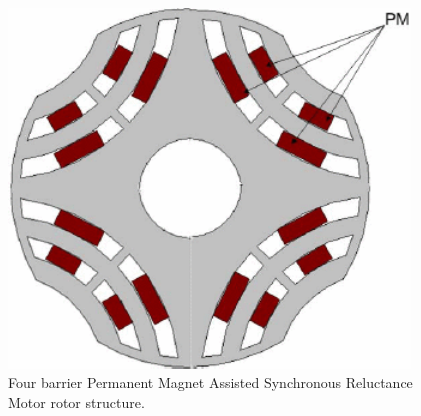 \documentclass[a4paper, twoside, 11pt]{article}
\begin{document}
    \begin{minipage}[t]{0.45\textwidth}
        \begin{figure}[H]
            \centering
            \includegraphics[width=0.95\textwidth]{src/png/four-barrier-pmasyrelm.png}
            \caption{Four barrier Permanent Magnet Assisted Synchronous Reluctance Motor rotor structure. \cite{talebi-Design-of-Permanent-Magnet-Assisted-Synchronous-Reluctance-Motors-Made-Easy}}
            \label{fig:four-barrier-pmasyrelm}
        \end{figure}
    \end{minipage}%
    \hfill
\end{document}
